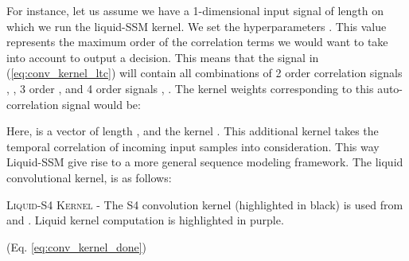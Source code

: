 \documentclass{MITcsail}
\begin{document}
\endgroup

For instance, let us assume we have a 1-dimensional input signal  of length  on which we run the liquid-SSM kernel. We set the hyperparameters . This value represents the maximum order of the correlation terms we would want to take into account to output a decision. This means that the signal  in (\ref{eq:conv_kernel_ltc}) will contain all combinations of 2 order correlation signals , , 3 order ,  and 4 order signals , . The kernel weights corresponding to this auto-correlation signal would be: 



Here,  is a vector of length , and the kernel . This additional kernel takes the temporal correlation of incoming input samples into consideration. This way Liquid-SSM give rise to a more general sequence modeling framework. The liquid convolutional kernel,  is as follows:

\begingroup
\small

\endgroup

\begingroup
\small
\begin{algorithm}[t]
  \caption{\textsc{Liquid-S4 Kernel} - The S4 convolution kernel (highlighted in black) is used from \citet{gu2022efficiently} and \citet{gu2022parameterization}. Liquid kernel computation is highlighted in purple.}\label{alg:liquid-s4-convolution}
  \begin{algorithmic}[1]
    \renewcommand{\algorithmicrequire}{\textbf{Input:}}
    \renewcommand{\algorithmicensure}{\textbf{Output:}}
     (Eq. \ref{eq:conv_kernel_done})
    \State 
    \State
    
    \label{step:cauchy}
    \State
    
     \State 
    \State 
     
    \State {\color{violet} }
    \EndFor
     
    \State {\color{violet} }
    \State {\color{violet} }
    \EndFor
    \EndIf
  \end{algorithmic}
\end{algorithm}
\endgroup
\end{document}
